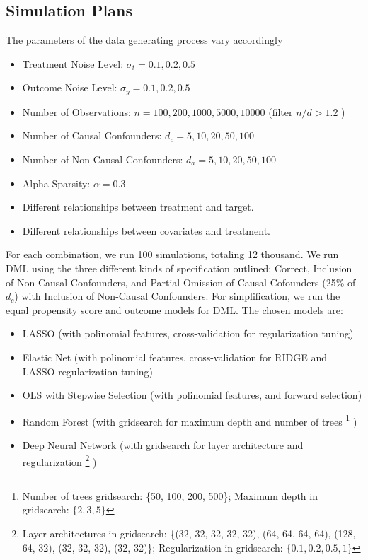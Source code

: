 \documentclass{article}
\numberwithin{equation}{section}
\begin{document}
\subsection{Simulation Plans}

The parameters of the data generating process vary accordingly
\begin{itemize}
    \item Treatment Noise Level: $\sigma_t = 0.1, 0.2, 0.5$
    \item Outcome Noise Level: $\sigma_y = 0.1, 0.2, 0.5$
    \item Number of Observations: $n = 100, 200, 1000, 5000, 10000$ (filter $n / d > 1.2$ )
    \item Number of Causal Confounders: $d_c = 5, 10, 20, 50, 100$
    \item Number of Non-Causal Confounders: $d_a = 5, 10, 20, 50, 100$
    \item Alpha Sparsity: $\alpha = 0.3$
    \item Different relationships between treatment and target.
    \item Different relationships between covariates and treatment.
\end{itemize}

For each combination, we run 100 simulations, totaling 12 thousand. We run DML using the three different kinds of specification outlined: Correct, Inclusion of Non-Causal Confounders, and Partial Omission of Causal Cofounders (25\% of $d_c$) with Inclusion of Non-Causal Confounders. For simplification, we run the equal propensity score and outcome models for DML. The chosen models are:

\begin{itemize}
    \item LASSO (with polinomial features, cross-validation for regularization tuning)
    \item Elastic Net (with polinomial features, cross-validation for RIDGE and LASSO regularization tuning)
    \item OLS with Stepwise Selection (with polinomial features, and forward selection)
    \item Random Forest (with gridsearch for maximum depth and number of trees
    \footnote{Number of trees gridsearch: \{50, 100, 200, 500\}; Maximum depth in gridsearch: $\{2, 3, 5\}$}
    )
    \item Deep Neural Network (with gridsearch for layer architecture and regularization
    \footnote{Layer architectures in gridsearch: \{(32, 32, 32, 32, 32), (64, 64, 64, 64), (128, 64, 32), (32, 32, 32), (32, 32)\}; Regularization in gridsearch: $\{0.1, 0.2, 0.5, 1\}$}
    )
\end{itemize}
\end{document}
